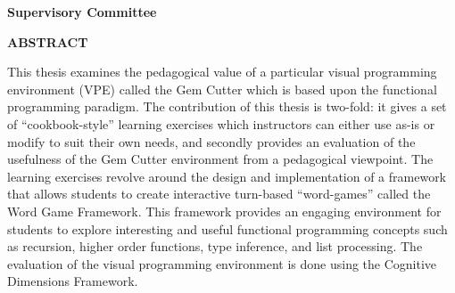 \newpage
{}

\noindent \textbf{Supervisory Committee}
\tpbreak
\panel

\begin{center}
\textbf{ABSTRACT}
\end{center}

This thesis examines the pedagogical value of a particular visual programming environment (VPE) called the Gem Cutter which is based upon the functional programming paradigm.  The contribution of this thesis is two-fold: it gives a set of ``cookbook-style'' learning exercises which instructors can either use as-is or modify to suit their own needs, and secondly provides an evaluation of the usefulness of the Gem Cutter environment from a pedagogical viewpoint.  The learning exercises revolve around the design and implementation of a framework that allows students to create interactive turn-based ``word-games'' called the Word Game Framework. This framework provides an engaging environment for students to explore interesting and useful functional programming concepts such as recursion, higher order functions, type inference, and list processing.  The evaluation of the visual programming environment is done using the Cognitive Dimensions Framework.